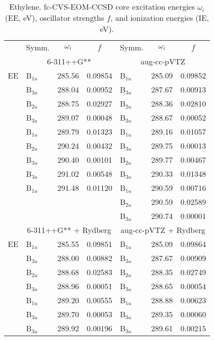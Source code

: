 \documentclass[journal=jctcce,manuscript=article]{achemso}
\begin{document}
\begin{table}
\small
\caption{Ethylene. fc-CVS-EOM-CCSD core excitation energies $\omega_i$ (EE, eV), oscillator strengths $f$, and
  ionization energies (IE, eV). \label{Tab:Ethylene} }
\scriptsize
\begin{tabular}{l|lcc|lcc}
\cline{2-7}
& Symm. & $\omega_i$ & $f$ & Symm. & $\omega_i$ & $f$ \\
\cline{2-7}
  & \multicolumn{3}{c|}{6-311++G**}
          & \multicolumn{3}{c}{aug-cc-pVTZ} \\
\hline
  EE 
& B$_{1u}$ & 285.56 & 0.09854        & B$_{1u}$ & 285.09 & 0.09852 \\
& B$_{3u}$ & 288.04 & 0.00952        & B$_{3u}$ & 287.67 & 0.00913 \\
& B$_{2u}$ & 288.75 & 0.02927        & B$_{2u}$ & 288.36 & 0.02810 \\
& B$_{3u}$ & 289.07 & 0.00048        & B$_{3u}$ & 288.67 & 0.00052 \\
& B$_{1u}$ & 289.79 & 0.01323        & B$_{1u}$ & 289.16 & 0.01057 \\
& B$_{2u}$ & 290.24 & 0.00432        & B$_{3u}$ & 289.75 & 0.00013 \\
& B$_{3u}$ & 290.40 & 0.00101        & B$_{2u}$ & 289.77 & 0.00467 \\
& B$_{3u}$ & 291.02 & 0.00548        & B$_{3u}$ & 290.33 & 0.01348 \\
& B$_{1u}$ & 291.48 & 0.01120        & B$_{1u}$ & 290.59 & 0.00716 \\
& & &         & B$_{2u}$ & 290.59 & 0.02589 \\
& & &         & B$_{3u}$ & 290.74 & 0.00001 \\
\cline{2-7}
      & \multicolumn{3}{c|}{6-311++G** + Rydberg}
      & \multicolumn{3}{c}{aug-cc-pVTZ + Rydberg} \\
\hline
  EE 
& B$_{1u}$ & 285.55 & 0.09851    & B$_{1u}$ & 285.09 & 0.09864 \\
& B$_{3u}$ & 288.00 & 0.00882    & B$_{3u}$ & 287.67 & 0.00909 \\
& B$_{2u}$ & 288.68 & 0.02583    & B$_{2u}$ & 288.35 & 0.02749 \\
& B$_{3u}$ & 288.96 & 0.00051    & B$_{3u}$ & 288.65 & 0.00054 \\
& B$_{1u}$ & 289.20 & 0.00555    & B$_{1u}$ & 288.88 & 0.00623 \\
& B$_{3u}$ & 289.70 & 0.00053    & B$_{3u}$ & 289.35 & 0.00060 \\
& B$_{3u}$ & 289.92 & 0.00196    & B$_{3u}$ & 289.61 & 0.00215 \\

\end{tabular}
\end{table}
\end{document}

